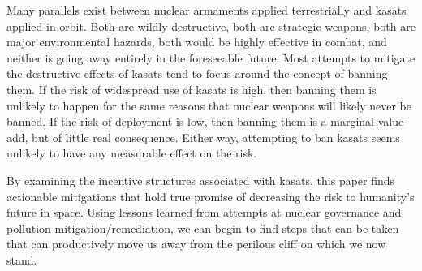 Many parallels exist between nuclear armaments applied terrestrially
and \acp{kasat} applied in orbit.  Both are wildly destructive, both
are strategic weapons, both are major environmental hazards, both
would be highly effective in combat, and neither is going away
entirely in the foreseeable future.  Most attempts to mitigate the
destructive effects of \acp{kasat} tend to focus around the concept of
banning them.\cite{early-to-call} If the risk of widespread use of
\acp{kasat} is high, then banning them is unlikely to happen for the
same reasons that nuclear weapons will likely never be banned.  If the
risk of deployment is low, then banning them is a marginal value-add,
but of little real consequence.  Either way, attempting to ban
\acp{kasat} seems unlikely to have any measurable effect on the risk.

By examining the incentive structures associated with \acp{kasat},
this paper finds actionable mitigations that hold true promise of
decreasing the risk to humanity's future in space.  Using lessons
learned from attempts at nuclear governance and pollution
mitigation/remediation, we can begin to find steps that can be taken
that can productively move us away from the perilous cliff on which we
now stand.
